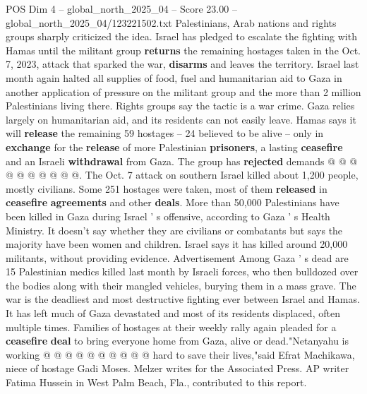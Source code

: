 \begin{textsample}{POS Dim 4 – global\_north\_2025\_04 – Score 23.00 – global\_north\_2025\_04/123221502.txt}
Palestinians, Arab nations and rights groups sharply criticized the idea.
Israel has pledged to escalate the fighting with Hamas until the militant group \textbf{returns} the remaining hostages taken in the Oct. 7, 2023, attack that sparked the war, \textbf{disarms} and leaves the territory.
Israel last month again halted all supplies of food, fuel and humanitarian aid to Gaza in another application of pressure on the militant group and the more than 2 million Palestinians living there.
Rights groups say the tactic is a war crime.
Gaza relies largely on humanitarian aid, and its residents can not easily leave.
Hamas says it will \textbf{release} the remaining 59 hostages -- 24 believed to be alive -- only in \textbf{exchange} for the \textbf{release} of more Palestinian \textbf{prisoners}, a lasting \textbf{ceasefire} and an Israeli \textbf{withdrawal} from Gaza.
The group has \textbf{rejected} demands @ @ @ @ @ @ @ @ @ @.
The Oct. 7 attack on southern Israel killed about 1,200 people, mostly civilians.
Some 251 hostages were taken, most of them \textbf{released} in \textbf{ceasefire} \textbf{agreements} and other \textbf{deals}.
More than 50,000 Palestinians have been killed in Gaza during Israel ' s offensive, according to Gaza ' s Health Ministry.
It doesn't say whether they are civilians or combatants but says the majority have been women and children.
Israel says it has killed around 20,000 militants, without providing evidence.
Advertisement Among Gaza ' s dead are 15 Palestinian medics killed last month by Israeli forces, who then bulldozed over the bodies along with their mangled vehicles, burying them in a mass grave.
The war is the deadliest and most destructive fighting ever between Israel and Hamas.
It has left much of Gaza devastated and most of its residents displaced, often multiple times.
Families of hostages at their weekly rally again pleaded for a \textbf{ceasefire} \textbf{deal} to bring everyone home from Gaza, alive or dead."Netanyahu is working @ @ @ @ @ @ @ @ @ @ hard to save their lives,"said Efrat Machikawa, niece of hostage Gadi Moses.
Melzer writes for the Associated Press.
AP writer Fatima Hussein in West Palm Beach, Fla., contributed to this report.

\end{textsample}
